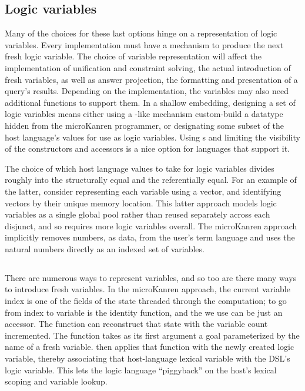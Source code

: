 \documentclass[sigplan,balance=true,pbalance=true,natbib=false]{acmart}
\begin{document}
\subsection{Logic variables}

Many of the choices for these last options hinge on a representation
of logic variables. Every implementation must have a mechanism to
produce the next fresh logic variable. The choice of variable
representation will affect the implementation of unification and
constraint solving, the actual introduction of fresh variables, as
well as answer projection, the formatting and presentation of a
query's results. Depending on the implementation, the variables may
also need additional functions to support them. In a shallow
embedding, designing a set of logic variables means either using
a -like mechanism custom-build a datatype hidden
from the microKanren programmer, or designating some subset of the
host language's values for use as logic variables.
Using s and limiting the visibility of the
constructors and accessors is a nice option for languages that support
it.

The choice of which host language values to take for logic variables
divides roughly into the structurally equal and the referentially
equal. For an example of the latter, consider representing each
variable using a vector, and identifying vectors by their unique
memory location. This latter approach models logic variables as a
single global pool rather than reused separately across each disjunct,
and so requires more logic variables overall. The microKanren approach
implicitly removes numbers, as data, from the user's term language and
uses the natural numbers directly as an indexed set of variables.

\subsection{}

There are numerous ways to represent variables, and so too are there
many ways to introduce fresh variables. In the microKanren approach,
the current variable index is one of the fields of the state threaded
through the computation; to go from index to variable is the identity
function, and the  we use can be just an
accessor. The function  can reconstruct that
state with the variable count incremented. The 
function takes as its first argument a goal parameterized by the name
of a fresh variable.  then applies that
function with the newly created logic variable, thereby associating
that host-language lexical variable with the DSL's logic variable.
This lets the logic language \enquote{piggyback} on the host's lexical
scoping and variable lookup.
\end{document}
